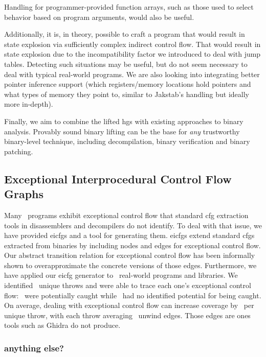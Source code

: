Handling for programmer-provided function arrays, such as those used to select behavior
based on program arguments, would also be useful.

Additionally, it is, in theory, possible to craft a program that would result in state explosion via sufficiently complex indirect control flow.
That would result in state explosion due to the incompatibility factor we introduced to deal with jump tables.
Detecting such situations may be useful, but do not seem necessary to deal with typical real-world programs.
We are also looking into integrating better pointer inference support (which registers/memory locations hold pointers and what types of memory they point to, similar to Jakstab's handling but ideally more in-depth).

Finally, we aim to combine the lifted \acp{hg} with existing approaches to binary analysis.
Provably sound binary lifting can be the base for \emph{any} trustworthy binary-level technique,
including decompilation, binary verification and binary patching.

\subsection{Exceptional Interprocedural Control Flow Graphs}
Many \Cpp\ programs exhibit exceptional control flow that standard \ac{cfg} extraction tools in disassemblers and decompilers do not identify.
To deal with that issue, we have provided \acp{eicfg} and a tool for generating them.
\acp{eicfg} extend standard \acp{cfg} extracted from binaries by including nodes and edges for exceptional control flow.
Our abstract transition relation for exceptional control flow has been informally shown to overapproximate the concrete versions of those edges.
Furthermore, we have applied our \ac{eicfg} generator to \totalbins\ real-world programs and libraries.
We identified \uniquethrows\ unique throws and were able to trace each one's exceptional control flow: \caughtthrows\ were potentially caught while \uncaughtthrows\ had no identified potential for being caught.
On average, dealing with exceptional control flow can increase coverage by \avgdiffinst\ per unique throw, with each throw averaging \avgunwinds\ unwind edges.
Those edges are ones tools such as Ghidra do not produce.

\subsubsection{anything else?}

